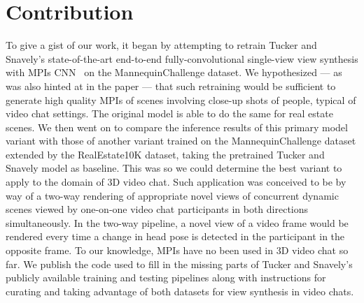 \section{Contribution}\label{sec:contribution} 

To give a gist of our work, it began by attempting to retrain Tucker and Snavely's state-of-the-art end-to-end fully-convolutional single-view view synthesis with MPIs CNN~\cite{single_view_mpi} on the MannequinChallenge dataset. We hypothesized --- as was also hinted at in the paper --- that such retraining would be sufficient to generate high quality MPIs of scenes involving close-up shots of people, typical of video chat settings. The original model is able to do the same for real estate scenes. We then went on to compare the inference results of this primary model variant with those of another variant trained on the MannequinChallenge dataset extended by the RealEstate10K dataset, taking the pretrained Tucker and Snavely model as baseline. This was so we could determine the best variant to apply to the domain of 3D video chat. Such application was conceived to be by way of a two-way rendering of appropriate novel views of concurrent dynamic scenes viewed by one-on-one video chat participants in both directions simultaneously. In the two-way pipeline, a novel view of a video frame would be rendered every time a change in head pose is detected in the participant in the opposite frame. To our knowledge, MPIs have no been used in 3D video chat so far. We publish the code used to fill in the missing parts of Tucker and Snavely's publicly available training and testing pipelines along with instructions for curating and taking advantage of both datasets for view synthesis in video chats.
